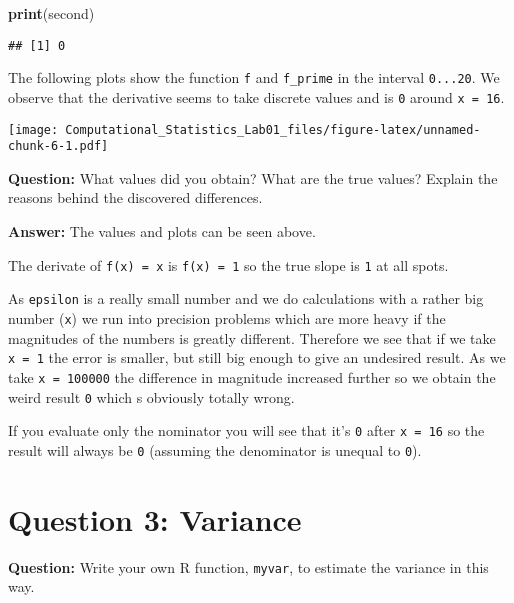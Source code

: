 \documentclass[]{article}
\newenvironment{Shaded}{\begin{snugshade}}{\end{snugshade}}
\newcommand{\KeywordTok}[1]{\textcolor[rgb]{0.13,0.29,0.53}{\textbf{#1}}}
\newcommand{\NormalTok}[1]{#1}
\begin{document}
\begin{Shaded}
\begin{Highlighting}[]
\KeywordTok{print}\NormalTok{(second)}
\end{Highlighting}
\end{Shaded}

\begin{verbatim}
## [1] 0
\end{verbatim}

The following plots show the function \texttt{f} and \texttt{f\_prime}
in the interval \texttt{0...20}. We observe that the derivative seems to
take discrete values and is \texttt{0} around \texttt{x\ =\ 16}.

\texttt{[image: Computational\_Statistics\_Lab01\_files/figure-latex/unnamed-chunk-6-1.pdf]}

\textbf{Question:} What values did you obtain? What are the true values?
Explain the reasons behind the discovered differences.

\textbf{Answer:} The values and plots can be seen above.

The derivate of \texttt{f(x)\ =\ x} is
\texttt{f\textquotesingle{}(x)\ =\ 1} so the true slope is \texttt{1} at
all spots.

As \texttt{epsilon} is a really small number and we do calculations with
a rather big number (\texttt{x}) we run into precision problems which
are more heavy if the magnitudes of the numbers is greatly different.
Therefore we see that if we take \texttt{x\ =\ 1} the error is smaller,
but still big enough to give an undesired result. As we take
\texttt{x\ =\ 100000} the difference in magnitude increased further so
we obtain the weird result \texttt{0} which s obviously totally wrong.

If you evaluate only the nominator you will see that it's \texttt{0}
after \texttt{x\ =\ 16} so the result will always be \texttt{0}
(assuming the denominator is unequal to \texttt{0}).

\section{Question 3: Variance}\label{question-3-variance}

\textbf{Question:} Write your own R function, \texttt{myvar}, to
estimate the variance in this way.
\end{document}
